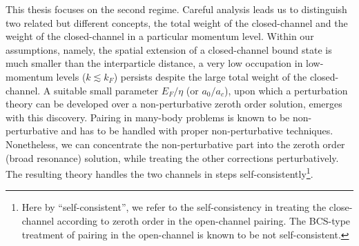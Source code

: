 This thesis focuses on the second regime.  Careful analysis leads us to distinguish two related but different concepts, the total weight of the closed-channel  and the weight of the closed-channel in a particular momentum level.  
       Within our assumptions, namely, the spatial extension of a closed-channel bound state is much smaller than the interparticle distance, a very low occupation in low-momentum levels ($k\lesssim{}k_{F}$) persists despite the large total weight of the closed-channel.     A suitable small parameter $E_F/\eta$ (or $a_0/a_c$), upon which a perturbation theory can be developed over a non-perturbative zeroth order solution, emerges with this discovery.  Pairing in many-body problems is known to be  non-perturbative and has to be handled with proper non-perturbative techniques.  Nonetheless, we can concentrate the non-perturbative part into the zeroth order  (broad resonance) solution, while treating the other corrections perturbatively.   The resulting theory  handles the two channels in steps self-consistently\footnote{Here by ``self-consistent'', we refer to the self-consistency in treating the close-channel according to zeroth order in the open-channel pairing.  The BCS-type treatment of pairing in the open-channel   is known to be not self-consistent. }. 
       
